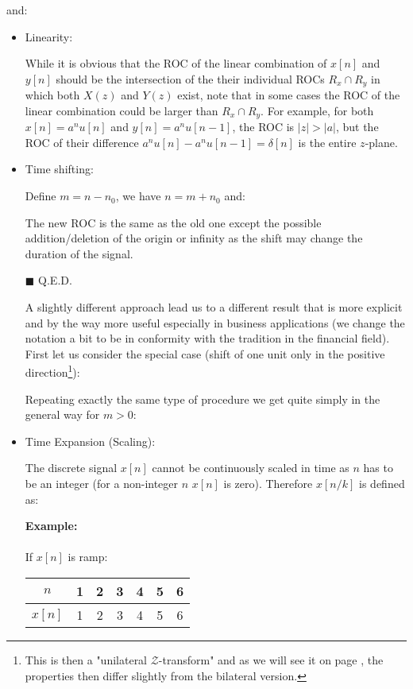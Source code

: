 	and:
	
	
	\begin{itemize}
		\item Linearity:
		
		While it is obvious that the ROC of the linear combination of $x[n]$ and $y[n]$ should be the intersection of the their individual ROCs $R_x \cap R_y$ in which both $X(z)$ and $Y(z)$ exist, note that in some cases the ROC of the linear combination could be larger than $R_x \cap R_y$. For example, for both $x[n]=a^n u[n]$ and $y[n]=a^n u[n-1]$, the ROC is $|z|>|a|$, but the ROC of their difference $a^n u[n]-a^n u[n-1]=\delta[n]$ is the entire $z$-plane.
		
		\item Time shifting:
		
		\begin{dem}
		
		Define $m=n-n_0$, we have $n=m+n_0$ and:
		
		The new ROC is the same as the old one except the possible addition/deletion of the origin or infinity as the shift may change the duration of the signal.
		\begin{flushright}
			$\blacksquare$  Q.E.D.
		\end{flushright}
		\end{dem}
		A slightly different approach lead us to a different result that is more explicit and by the way more useful especially in business applications (we change the notation a bit to be in conformity with the tradition in the financial field). First let us consider the special case (shift of one unit only in the positive direction\footnote{This is then a "unilateral $\mathcal{Z}$-transform" and as we will see it on page , the properties then differ slightly from the bilateral version.}):
		
		Repeating exactly the same type of procedure we get quite simply in the general way for $m>0$:
		
		
		\item Time Expansion (Scaling):
		
		
		The discrete signal $x[n]$ cannot be continuously scaled in time as $n$ has to be an integer (for a non-integer $n$ $x[n]$ is zero). Therefore $x[n/k]$ is defined as:
		
		\begin{tcolorbox}[colframe=black,colback=white,sharp corners]
		\textbf{{\Large {}}Example:}\\\\
		If $x[n]$ is ramp:
		\begin{table}[H]
		\centering
		\begin{tabular}{c|cccccc} \hline
		 $n$ & 1 & 2 & 3 & 4 & 5 & 6 \\ \hline 
		 $x[n]$ & 1 & 2 & 3 & 4 & 5 & 6 \\ \hline 
		\end{tabular}
		\end{table}
		

\end{tcolorbox}
\end{itemize}
